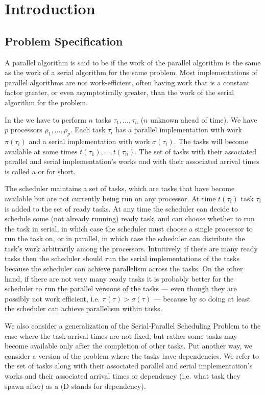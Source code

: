 \section{Introduction}
\label{sec:intro}
\subsection{Problem Specification}
A parallel algorithm is said to be  if the
work of the parallel algorithm is the same as the work of a
serial algorithm for the same problem. Most implementations of
parallel algorithms are not work-efficient, often having work
that is a constant factor greater, or even asymptotically
greater, than the work of the serial algorithm for the problem.

In the  we have to
perform $n$ tasks $\tau_1, \ldots, \tau_n$ ($n$ unknown ahead of
time). We have $p$ processors $\rho_1, \ldots, \rho_p$. Each task
$\tau_i$ has a parallel implementation with work $\pi(\tau_i)$ and a
serial implementation with work $\sigma(\tau_i)$. The tasks will become
available at some times $t(\tau_1), \ldots, t(\tau_n)$. 
The set of tasks with their associated parallel and serial
implementation's works and with their associated arrival times is
called a  or  for short.

The scheduler maintains a set of  tasks, which are
tasks that have become available but are not currently being run
on any processor. At time $t(\tau_i)$ task $\tau_i$ is added to
the set of ready tasks. At any time the scheduler can decide to
schedule some (not already running) ready task, and can choose
whether to run the task in serial, in which case the scheduler
must choose a single processor to run the task on, or in
parallel, in which case the scheduler can distribute the task's
work arbitrarily among the processors. Intuitively, if there are
many ready tasks then the scheduler should run the serial
implementations of the tasks because the scheduler can achieve
parallelism across the tasks. On the other hand, if there are not
very many ready tasks it is probably better for the scheduler to
run the parallel versions of the tasks --- even though they are
possibly not work efficient, i.e. $\pi(\tau) > \sigma(\tau)$ ---
because by so doing at least the scheduler can achieve
parallelism within tasks.

We also consider a generalization of the Serial-Parallel
Scheduling Problem to the case where the task arrival times are
not fixed, but rather some tasks may become available only after
the completion of other tasks. Put another way, we consider a
version of the problem where the tasks have dependencies. We
refer to the set of tasks along with their associated parallel
and serial implementation's works and their associated arrival
times or dependency (i.e. what task they spawn after) as a
 (D stands for dependency).

